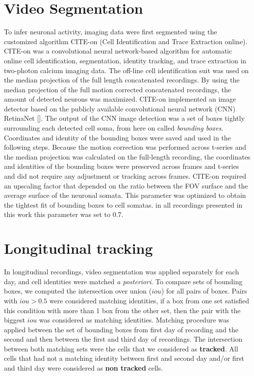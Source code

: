 \section{Video Segmentation}
\label{chap3:sec:4:segmentation}
To infer neuronal activity, imaging data were first segmented using the customized algorithm CITE-on (Cell Identification and Trace Extraction online). 
CITE-on was a convolutional neural network-based algorithm for automatic online cell identification, segmentation, identity tracking, and trace extraction in two-photon calcium imaging data. 
The off-line cell identification suit was used on the median projection of the full length concatenated recordings.
By using the median projection of the full motion corrected concatenated recordings, the amount of detected neurons was maximized.
CITE-on implemented an image detector based on the publicly available convolutional neural network (CNN) RetinaNet [\cite{lin2020}].
The output of the CNN image detection was a set of boxes tightly surrounding each detected cell soma, from here on called \textit{bounding boxes}.
Coordinates and identity of the bounding boxes were saved and used in the following steps. 
Because the motion correction was performed across t-series and the median projection was calculated on the full-length recording, the coordinates and identities of the bounding boxes were preserved across frames and t-series and did not require any adjustment or tracking across frames. 
CITE-on required an upscaling factor that depended on the ratio between the FOV surface and the average surface of the neuronal somata. 
This parameter was optimized to obtain the tightest fit of bounding boxes to cell somatas. in all recordings presented in this work this parameter was set to $0.7$.  

\section{Longitudinal tracking}
\label{chap3:sec:5:long_tracking}
In longitudinal recordings, video segmentation was applied separately for each day, and cell identities were matched \textit{a posteriori}. 
To compare sets of bounding boxes, we computed the intersection over union ($iou$) for all pairs of boxes. 
Pairs with $iou>0.5$ were considered matching identities, if a box from one set satisfied this condition with more than 1 box from the other set, then the pair with the biggest $iou$ was considered as matching identities. 
Matching procedure was applied between the set of bounding boxes from first day of recording and the second and then between the first and third day of recordings.
The intersection between both matching sets were the cells that we considered as \textbf{tracked}.
All cells that had not a matching identity between first and second day and/or first and third day were considered as \textbf{non tracked} cells. 
